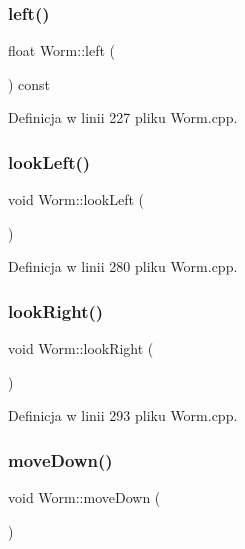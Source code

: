 \subsubsection{\texorpdfstring{left()}{left()}}
{\footnotesize\ttfamily float Worm\+::left (\begin{DoxyParamCaption}{ }\end{DoxyParamCaption}) const}



Definicja w linii 227 pliku Worm.\+cpp.

\mbox{\label{class_worm_a84fbbdac67be083a5492bf38cf83544b}} 
\subsubsection{\texorpdfstring{look\+Left()}{lookLeft()}}
{\footnotesize\ttfamily void Worm\+::look\+Left (\begin{DoxyParamCaption}{ }\end{DoxyParamCaption})}



Definicja w linii 280 pliku Worm.\+cpp.

\mbox{\label{class_worm_a4dbc714c26c5b09a94bd53f10172b4c1}} 
\subsubsection{\texorpdfstring{look\+Right()}{lookRight()}}
{\footnotesize\ttfamily void Worm\+::look\+Right (\begin{DoxyParamCaption}{ }\end{DoxyParamCaption})}



Definicja w linii 293 pliku Worm.\+cpp.

\mbox{\label{class_worm_a08f64ed1ed9149084d8d64296253c4be}} 
\subsubsection{\texorpdfstring{move\+Down()}{moveDown()}}
{\footnotesize\ttfamily void Worm\+::move\+Down (\begin{DoxyParamCaption}{ }\end{DoxyParamCaption})}



